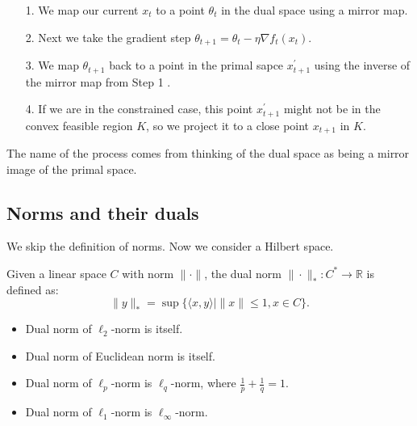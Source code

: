 \begin{itemize}
    \item [1.] We map our current $x_t$ to a point $\theta_t$ in the dual space using a mirror map.
    \item [2.] Next we take the gradient step $\theta_{t+1}=\theta_t-\eta \nabla f_t\left(x_t\right)$.
    \item [3.] We map $\theta_{t+1}$ back to a point in the primal sapce $x_{t+1}^{\prime}$ using the inverse of the mirror map from Step 1 .
    \item [4.] If we are in the constrained case, this point $x_{t+1}^{\prime}$ might not be in the convex feasible region $K$, so we project it to a close point $x_{t+1}$ in $K$.
\end{itemize}

The name of the process comes from thinking of the dual space as being a mirror image of the primal space.

\subsection{Norms and their duals}
We skip the definition of norms. Now we consider a Hilbert space.

\begin{definition}
\label{def: Dual norm}
Given a linear space $C$ with norm $\|\cdot\|$, the dual norm $\|\cdot\|_*: C^* \rightarrow \mathbb{R}$ is defined as:
$$
\|y\|_*=\sup \{\langle x, y\rangle \mid\|x\| \leqslant 1, x \in C\} .
$$
\end{definition}


\begin{example}
\label{eg: Exampls of dual norms}
\begin{itemize}
    \item []
    \item Dual norm of $\ell_2$-norm is itself.
    \item Dual norm of Euclidean norm is itself.
    \item Dual norm of $\ell_p$-norm is $\ell_q$-norm, where $\frac{1}{p}+\frac{1}{q}=1$.
    \item Dual norm of $\ell_1$-norm is $\ell_{\infty}$-norm.
\end{itemize}
\end{example}



